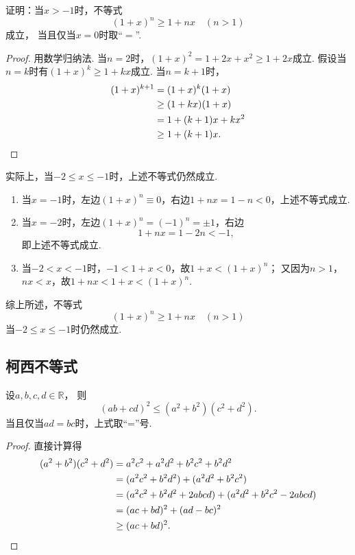 \begin{example}
证明：当\(x > -1\)时，不等式\begin{equation}
	(1+x)^n \geq 1+nx \quad (n>1)
\end{equation}成立，
当且仅当\(x=0\)时取“\(=\)”.
\begin{proof}
用数学归纳法.
当\(n=2\)时，\((1+x)^2 = 1+2x+x^2 \geq 1+2x\)成立.
假设当\(n=k\)时有\((1+x)^k \geq 1+kx\)成立.
当\(n=k+1\)时，\begin{align*}
	(1+x)^{k+1}
	&= (1+x)^k (1+x) \\
	&\geq (1+kx)(1+x) \\
	&= 1 + (k+1)x + kx^2 \\
	&\geq 1 + (k+1)x.
	\qedhere
\end{align*}
\end{proof}
实际上，当\(-2 \leq x \leq -1\)时，上述不等式仍然成立.

\begin{enumerate}
	\item 当\(x = -1\)时，左边\((1+x)^n \equiv 0\)，右边\(1+nx = 1 - n < 0\)，上述不等式成立.

	\item 当\(x = -2\)时，左边\((1+x)^n = (-1)^n = \pm1\)，右边\begin{equation*}
	1+nx = 1-2n < -1,
	\end{equation*}即上述不等式成立.

	\item 当\(-2 < x < -1\)时，\(-1 < 1+x < 0\)，故\(1+x < (1+x)^n\)；
	又因为\(n>1\)，\(nx<x\)，故\(1+nx < 1+x < (1+x)^n\).
\end{enumerate}
综上所述，不等式\begin{equation*}
	(1+x)^n \geq 1+nx \quad (n>1)
\end{equation*}当\(-2 \leq x \leq -1\)时仍然成立.
\end{example}

\subsection{柯西不等式}
\begin{theorem}
设\(a,b,c,d\in\mathbb{R}\)，
则\begin{equation}
	(ab+cd)^2
	\leq
	(a^2+b^2)(c^2+d^2).
\end{equation}
当且仅当\(ad=bc\)时，上式取“=”号.
\begin{proof}
直接计算得\begin{align*}
	(a^2+b^2)(c^2+d^2)
	&= a^2 c^2 + a^2 d^2 + b^2 c^2 + b^2 d^2 \\
	&= (a^2 c^2 + b^2 d^2) + (a^2 d^2 + b^2 c^2) \\
	&= (a^2 c^2 + b^2 d^2 + 2abcd)
	+ (a^2 d^2 + b^2 c^2 - 2abcd) \\
	&= (ac+bd)^2 + (ad-bc)^2 \\
	&\geq (ac+bd)^2.
	\qedhere
\end{align*}
\end{proof}
\end{theorem}

